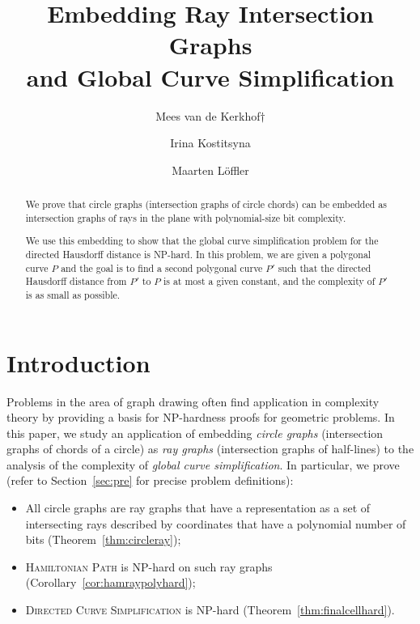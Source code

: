 \documentclass[]{llncs}
\title {Embedding Ray Intersection Graphs \\ and Global Curve Simplification}
\author
{
  Mees van de Kerkhof$\dagger$\inst{1}
  \and
  Irina Kostitsyna\inst{2}\orcidID{0000-0003-0544-2257}
  \and
  Maarten L\"offler\inst{1}
}
\institute
{
  Department of Computing and Information Sciences, Utrecht University\\
  \email{m.vandekerkhof@uu.nl \quad m.loffler@uu.nl}
  \and
  Department of Mathematics and Computer Science, TU Eindhoven\\
  \email{i.kostitsyna@tue.nl} \\
  $\dagger$: Corresponding author
}
\newcommand{\hampath}{\textsc{Hamiltonian Path}\xspace}
\newcommand{\curvesimp}{\textsc{Directed Curve Simplification}\xspace}
\begin{document}
\maketitle
\begin{abstract}
  We prove that circle graphs (intersection graphs of circle chords) can be embedded as intersection graphs of rays in the plane with polynomial-size bit complexity.
  
  We use this embedding to show that the global curve simplification problem for the directed Hausdorff distance is NP-hard.
  In this problem, we are given a polygonal curve $P$ and the goal is to find a second polygonal curve $P'$ such that the directed Hausdorff distance from $P'$ to $P$ is at most a given constant, and the complexity of $P'$ is as small as possible.
  
  
  
\end{abstract}





\section {Introduction}

Problems in the area of graph drawing often find application in complexity theory by providing a basis for NP-hardness proofs for geometric problems. 
%
In this paper, we study an application of embedding {\em circle graphs} (intersection graphs of chords of a circle) as {\em ray graphs} (intersection graphs of half-lines) to the analysis of the complexity of {\em global curve simplification}.
%
In particular, we prove (refer to Section~\ref {sec:pre} for precise problem definitions):

\begin {itemize}
  \item All circle graphs are ray graphs that have a representation as a set of intersecting rays described by coordinates that have a polynomial number of bits   (Theorem~\ref {thm:circleray});
  \item \hampath is NP-hard on such ray graphs (Corollary~\ref {cor:hamraypolyhard});
  \item \curvesimp is NP-hard (Theorem~\ref {thm:finalcellhard}).
\end {itemize}
\end{document}
